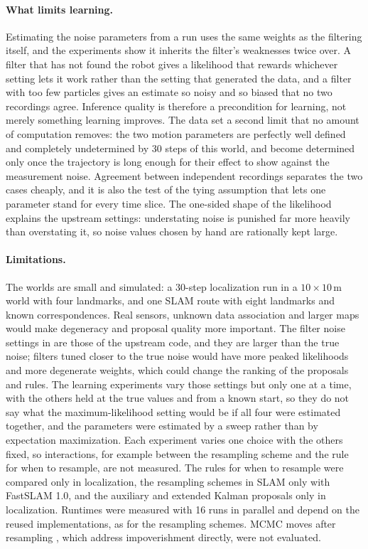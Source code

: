 \paragraph{What limits learning.} Estimating the noise parameters from a run uses the same weights as the filtering
itself, and the experiments show it inherits the filter's weaknesses twice over. A filter that has not found the
robot gives a likelihood that rewards whichever setting lets it work rather than the setting that generated the
data, and a filter with too few particles gives an estimate so noisy and so biased that no two recordings agree.
Inference quality is therefore a precondition for learning, not merely something learning improves. The data set a
second limit that no amount of computation removes: the two motion parameters are perfectly well defined and
completely undetermined by 30 steps of this world, and become determined only once the trajectory is long enough
for their effect to show against the measurement noise. Agreement between independent recordings separates the two
cases cheaply, and it is also the test of the tying assumption that lets one parameter stand for every time slice.
The one-sided shape of the likelihood explains the upstream settings: understating noise is punished far more
heavily than overstating it, so noise values chosen by hand are rationally kept large.

\paragraph{Limitations.} The worlds are small and simulated: a 30-step localization run in a $10 \times 10$\,m world
with four landmarks, and one SLAM route with eight landmarks and known correspondences. Real sensors, unknown data
association and larger maps would make degeneracy and proposal quality more important. The filter noise settings in
 are those of the upstream code, and they are larger than the true noise; filters tuned
closer to the true noise would have more peaked likelihoods and more degenerate weights, which could change the
ranking of the proposals and rules. The learning experiments vary those settings but only one at a time, with the
others held at the true values and from a known start, so they do not say what the maximum-likelihood setting would
be if all four were estimated together, and the parameters were estimated by a sweep rather than by expectation
maximization. Each
experiment varies one choice with the others fixed, so interactions, for example between the resampling scheme and the
rule for when to resample, are not measured. The rules for when to resample were compared only in localization, the
resampling schemes in SLAM only with FastSLAM 1.0, and the auxiliary and extended Kalman proposals only in localization.
Runtimes were measured with 16 runs in parallel and depend on the reused implementations, as for the resampling
schemes. MCMC moves after resampling \cite{gilks2001following}, which address impoverishment directly, were not
evaluated.

